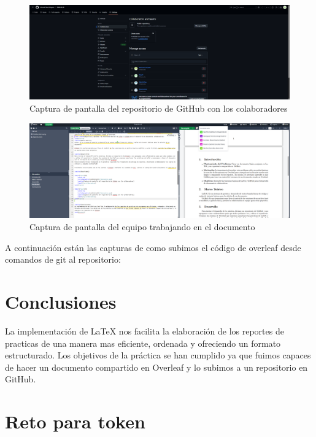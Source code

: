 \documentclass[letterpaper,12pt]{article}
\begin{document}
\begin{figure}[H]
    \centering
    \includegraphics[width=14cm]{Imagenes/Colaboradores.png}
    \caption{Captura de pantalla del repositorio de GitHub con los colaboradores}
    \label{fig:colaboradores}
\end{figure}


\begin{figure}[H]
    \centering
    \includegraphics[width=14cm]{Imagenes/Edicion.png}
    \caption{Captura de pantalla del equipo trabajando en el documento}
    \label{fig:colaboradores}
\end{figure}

A continuación están las capturas de como subimos el código de overleaf desde comandos de git al repositorio:

\section{Conclusiones}
La implementación de LaTeX nos facilita la elaboración de los reportes de practicas de una manera mas eficiente, ordenada y ofreciendo un formato estructurado. Los objetivos de la práctica se han cumplido ya que fuimos capaces de hacer un documento compartido en Overleaf y lo subimos a un repositorio en GitHub.

\section{Reto para token}
\end{document}
